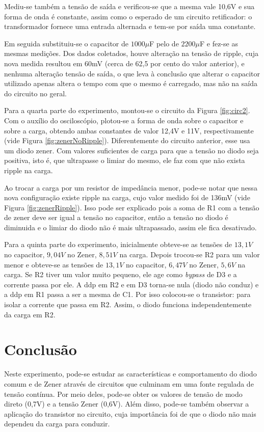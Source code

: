 \documentclass{article}
\begin{document}
Mediu-se também a tensão de saída e verificou-se que a mesma vale 10,6V e sua forma de onda é constante, assim como o esperado de um circuito retificador: o transformador fornece uma entrada alternada e tem-se por saída uma constante.

Em seguida substituiu-se o capacitor de $1000\mu$F pelo de $2200\mu$F e fez-se as mesmas medições. Dos dados coletados, houve alteração na tensão de ripple, cuja nova medida resultou em 60mV (cerca de 62,5 por cento do valor anterior), e nenhuma alteração tensão de saída, o que leva à conclusão que alterar o capacitor utilizado apenas altera o tempo com que o mesmo é carregado, mas não na saída do circuito no geral.

Para a quarta parte do experimento, montou-se o circuito da Figura \ref{fig:circ2}. Com o auxílio do osciloscópio, plotou-se a forma de onda sobre o capacitor e sobre a carga, obtendo ambas constantes de valor 12,4V e 11V, respectivamente (vide Figura \ref{fig:zenerNoRipple}). Diferentemente do circuito anterior, esse usa um diodo zener. Com valores suficientes de carga para que a tensão no diodo seja positiva, isto é, que ultrapasse o limiar do mesmo, ele faz com que não exista ripple na carga.

Ao trocar a carga por um resistor de impedância menor, pode-se notar que nessa nova configuração existe ripple na carga, cujo valor medido foi de 136mV (vide Figura \ref{fig:zenerRipple}). Isso pode ser explicado pois a soma de R1 com a tensão de zener deve ser igual a tensão no capacitor, então a tensão no diodo é diminuida e o limiar do diodo não é mais ultrapassado, assim ele fica desativado.

Para a quinta parte do experimento, inicialmente obteve-se as tensões de $13,1V$ no capacitor, $9,04V$ no Zener, $8,51V$ na carga. Depois trocou-se R2 para um valor menor e obteve-se as tensões de $13,1V$ no capacitor, $6,47V$ no Zener, $5,6V$ na carga. Se R2 tiver um valor muito pequeno, ele age como \textit{bypass} de D3 e a corrente passa por ele. A ddp em R2 e em D3 torna-se nula (diodo não conduz) e a ddp em R1 passa a ser a mesma de C1. Por isso colocou-se o transistor: para isolar a corrente que passa em R2. Assim, o diodo funciona independentemente da carga em R2.

\section{Conclusão}

Neste experimento, pode-se estudar as características e comportamento do diodo comum e de Zener através de circuitos que culminam em uma fonte regulada de tensão contínua. Por meio deles, pode-se obter os valores de tensão de modo direto (0,7V) e a tensão Zener (0,6V). Além disso, pode-se também observar a aplicação do transistor no circuito, cuja importância foi de que o diodo não mais dependeu da carga para conduzir.
\end{document}
